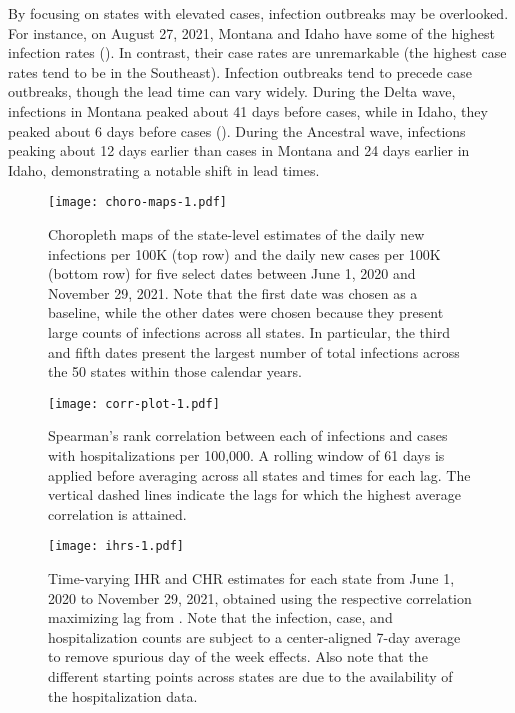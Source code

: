 By focusing on states with elevated cases, infection outbreaks may be
overlooked. For instance, on August 27, 2021, Montana and Idaho have some of the
highest infection rates (). In contrast, their
case rates are unremarkable (the highest case rates tend to be in the
Southeast). Infection outbreaks tend to precede case outbreaks, though the lead
time can vary widely. During the Delta wave, infections in Montana 
peaked about 41 days before cases, while in Idaho, they peaked about 6 days before cases
(). During the Ancestral wave, 
infections peaking about 12 days earlier than cases in Montana and 24 days earlier in Idaho,
demonstrating a notable shift in lead times.

\begin{figure}[H]
\centering
\texttt{[image: choro-maps-1.pdf]}
\caption{Choropleth maps of the state-level estimates of the daily new
infections per 100K (top row) and the daily new cases per 100K (bottom row) for
five select dates between June 1, 2020 and November 29, 2021. Note that the
first date was chosen as a baseline, while the other dates were chosen because
they present large counts of infections across all states. In particular, the
third and fifth dates present the largest number of total infections across the
50 states within those calendar years.} %
\label{fig:choro_inf_case_rates}
\end{figure}    

\begin{figure}[H]
\centering
\texttt{[image: corr-plot-1.pdf]} 
\caption{Spearman's rank correlation between each of 
infections and cases with hospitalizations per 100,000. A rolling window of 61 days
 is applied before averaging across all states and times for each lag.
The vertical dashed lines
indicate the lags for which the highest average correlation is attained.}
\label{fig:correlations}
\end{figure}

\begin{figure}[H]
\centering
\texttt{[image: ihrs-1.pdf]}
\caption{Time-varying IHR and CHR estimates for each state from June 1, 2020 to
November 29, 2021, obtained using the respective correlation maximizing lag from
. Note that the infection, case, and
hospitalization counts are subject to a center-aligned 7-day average to remove
spurious day of the week effects. Also note that the different starting points
across states are due to the availability of the hospitalization data.}
\label{fig:IHR_7dav}
\end{figure} 


